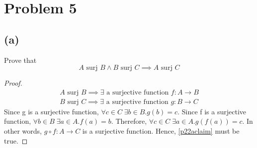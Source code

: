 \documentclass{article}
\newcommand{\surj}{\text{ surj }}
\begin{document}
\pagebreak

\section{Problem 5}
\subsection{(a)}
Prove that
\begin{equation}\label{p22aclaim}
	A \surj B \land B \surj C \implies A \surj C
\end{equation}
\begin{proof}
	\begin{align*}
		A \surj B \implies \exists \text{ a surjective function } f : A \rightarrow B \\
		B \surj C \implies \exists \text{ a surjective function } g : B \rightarrow C
	\end{align*}
	Since g is a surjective function, $\forall c \in C \; \exists b \in B.g(b) = c$. Since f is a surjective function, $\forall b \in B \; \exists a \in A.f(a) = b$. Therefore, $\forall c \in C \; \exists a \in A.g(f(a)) = c$. In other words, $g \circ f : A \rightarrow C$ is a surjective function. Hence, \eqref{p22aclaim} must be true.
\end{proof}
\end{document}
